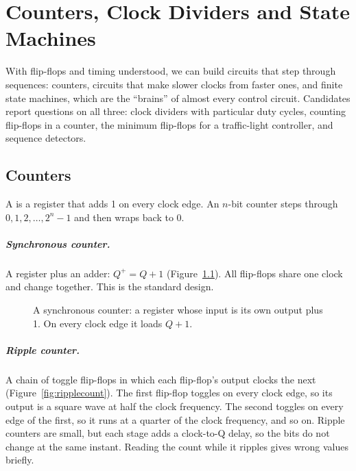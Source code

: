 \chapter{Counters, Clock Dividers and State Machines}
\label{ch:fsm}

With flip-flops and timing understood, we can build circuits that step through sequences: counters, circuits that make slower clocks from faster ones, and finite state machines, which are the ``brains'' of almost every control circuit. Candidates report questions on all three: clock dividers with particular duty cycles, counting flip-flops in a counter, the minimum flip-flops for a traffic-light controller, and sequence detectors.

\section{Counters}

A  is a register that adds 1 on every clock edge. An $n$-bit counter steps through $0, 1, 2, \ldots, 2^n - 1$ and then wraps back to 0.

\paragraph{Synchronous counter.} A register plus an adder: $Q^+ = Q + 1$ (Figure~\ref{fig:counter}). All flip-flops share one clock and change together. This is the standard design.

\begin{figure}[h]
\centering
{}
\caption{A synchronous counter: a register whose input is its own output plus 1. On every clock edge it loads $Q + 1$.}
\label{fig:counter}
\end{figure}

\paragraph{Ripple counter.} A chain of toggle flip-flops in which each flip-flop's output clocks the next (Figure~\ref{fig:ripplecount}). The first flip-flop toggles on every clock edge, so its output is a square wave at half the clock frequency. The second toggles on every edge of the first, so it runs at a quarter of the clock frequency, and so on. Ripple counters are small, but each stage adds a clock-to-Q delay, so the bits do not change at the same instant. Reading the count while it ripples gives wrong values briefly.

